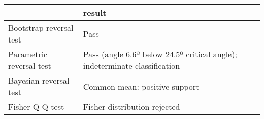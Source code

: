 \begin{tabular}{ll}
\toprule
{} &                                                                      result \\
\midrule
Bootstrap reversal test  &                                                                        Pass \\
Parametric reversal test &  Pass (angle 6.6º below 24.5º critical angle); indeterminate classification \\
Bayesian reversal test   &                                               Common mean: positive support \\
Fisher Q-Q test          &                                                Fisher distribution rejected \\
\bottomrule
\end{tabular}
